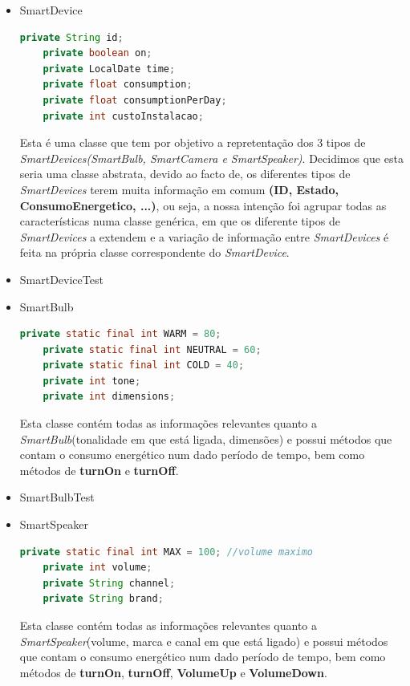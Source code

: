 \documentclass[11pt,a4paper]{report}
\begin{document}
        \begin{itemize}
        \item SmartDevice
        \begin{lstlisting}[language=java,firstnumber=1]
    private String id;
    private boolean on;
    private LocalDate time;
    private float consumption;
    private float consumptionPerDay;
    private int custoInstalacao;
    \end{lstlisting}
    
    Esta é uma classe que tem por objetivo a repretentação dos 3 tipos de \textit{SmartDevices(SmartBulb, SmartCamera e SmartSpeaker)}. Decidimos que esta seria uma classe abstrata, devido ao facto de, os diferentes tipos de\textit{ SmartDevices} terem muita informação em comum \textbf{(ID, Estado, ConsumoEnergetico, ...)}, ou seja, a nossa intenção foi agrupar todas as características numa classe genérica, em que os diferente tipos de \textit{SmartDevices} a extendem e a variação de informação entre \textit{SmartDevices} é feita na própria classe correspondente do \textit{SmartDevice}.  
    
        \item SmartDeviceTest
        \item SmartBulb
        \begin{lstlisting}[language=java,firstnumber=1]
    private static final int WARM = 80;
    private static final int NEUTRAL = 60;
    private static final int COLD = 40;
    private int tone;
    private int dimensions;
    \end{lstlisting}
    
    Esta classe contém todas as informações relevantes quanto a\textit{ SmartBulb}(tonalidade em que está ligada, dimensões) e possui métodos que contam o consumo energético num dado período de tempo, bem como métodos de\textbf{ turnOn} e \textbf{turnOff}.
    
        \item SmartBulbTest
        \item SmartSpeaker
        \begin{lstlisting}[language=java,firstnumber=1]
    private static final int MAX = 100; //volume maximo
    private int volume;
    private String channel;
    private String brand;
    \end{lstlisting}
    
    Esta classe contém todas as informações relevantes quanto a\textit{ SmartSpeaker}(volume, marca e canal em que está ligado) e possui métodos que contam o consumo energético num dado período de tempo, bem como métodos de\textbf{ turnOn}, \textbf{turnOff}, \textbf{VolumeUp} e \textbf{VolumeDown}.
    

\end{itemize}
\end{document}
